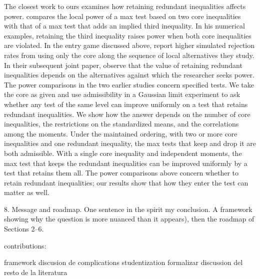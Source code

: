 \documentclass[11pt]{article}
\numberwithin{equation}{section}
\theoremstyle{definition}
\begin{document}
The closest work to ours examines how retaining redundant inequalities affects power. \citet[Section~2.3.3]{ponomarev:22} compares the local power of a max test based on two core inequalities with that of a max test that adds an implied third inequality. In his numerical examples, retaining the third inequality raises power when both core inequalities are violated. In the entry game discussed above, \citet[Section~5.3]{luo/wang:18} report higher simulated rejection rates from using only the core along the sequence of local alternatives they study. In their subsequent joint paper, \citet*[Section~4.3.1]{luo/ponomarev/wang:26} observe that the value of retaining redundant inequalities depends on the alternatives against which the researcher seeks power. The power comparisons in the two earlier studies concern specified tests. We take the core as given and use admissibility in a Gaussian limit experiment to ask whether any test of the same level can improve uniformly on a test that retains redundant inequalities. We show how the answer depends on the number of core inequalities, the restrictions on the standardized means, and the correlations among the moments. Under the maintained ordering, with two or more core inequalities and one redundant inequality, the max tests that keep and drop it are both admissible. With a single core inequality and independent moments, the max test that keeps the redundant inequalities can be improved uniformly by a test that retains them all. The power comparisons above concern whether to retain redundant inequalities; our results show that how they enter the test can matter as well.

8. Message and roadmap. One sentence in the spirit my conclusion. A framework showing why the question is more nuanced than it appears), then the roadmap of Sections 2–6.

contributions:

framework 
discusion de complications
studentization
formalizar discussion del resto de la literatura
\end{document}
